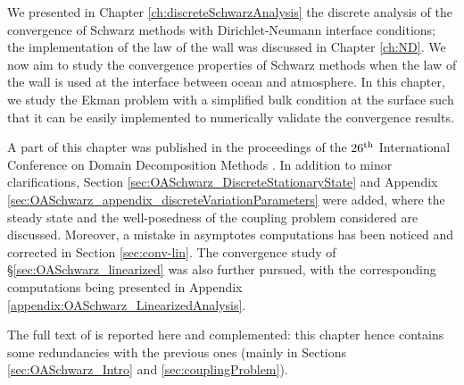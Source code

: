 We presented in Chapter \ref{ch:discreteSchwarzAnalysis}
the discrete analysis of the convergence of Schwarz methods
with Dirichlet-Neumann interface conditions;
the implementation of the law of the wall was discussed
in Chapter \ref{ch:ND}. We now aim to study the convergence
properties of Schwarz methods when the law of the wall is
used at the interface between ocean and
atmosphere. In this chapter, we study the Ekman problem with a
simplified bulk condition at the surface such that
it can be easily implemented to numerically validate the
convergence results.
\par
A part of this chapter was published in the proceedings of the
$26^{\rm th}$ International Conference on Domain Decomposition Methods
\citep{clement_discrete_2021}.
In addition to minor clarifications, Section
\ref{sec:OASchwarz_DiscreteStationaryState} and Appendix
\ref{sec:OASchwarz_appendix_discreteVariationParameters} were added,
where the steady state and the well-posedness
of the coupling problem considered are discussed.
Moreover, a mistake in asymptotes computations has been noticed
and corrected in Section \ref{sec:conv-lin}. The convergence
study of \S \ref{sec:OASchwarz_linearized} was also further pursued,
with the corresponding computations being presented in Appendix
\ref{appendix:OASchwarz_LinearizedAnalysis}.
\par
The full text of \citep{clement_discrete_2021} is reported
here and complemented: this chapter hence contains some redundancies
with the previous ones (mainly in
Sections \ref{sec:OASchwarz_Intro} and \ref{sec:couplingProblem}).
%
